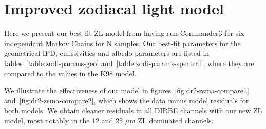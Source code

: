 \documentclass[twocolumn]{aa}
\begin{document}
\section{Improved zodiacal light model}\label{sect:improved-model}
Here we present our best-fit ZL model from having run Commander3 for six independant
Markov Chains for N samples. Our best-fit parameters for the geometrical IPD, emissivities 
and albedo parameters are listed in tables~\ref{table:zodi-params-geo} 
and~\ref{table:zodi-params-spectral}, where they are compared to the values in the K98 model.


We illustrate the effectiveness of our model in figures~\ref{fig:dr2-zsma-compare1} 
and~\ref{fig:dr2-zsma-compare2}, which shows the data minus model residuals for both models.
We obtain cleaner residuals in all DIRBE channels with our new ZL model, most notably in the 12 and 25 $\mu$m  
ZL dominated channels.
\end{document}
